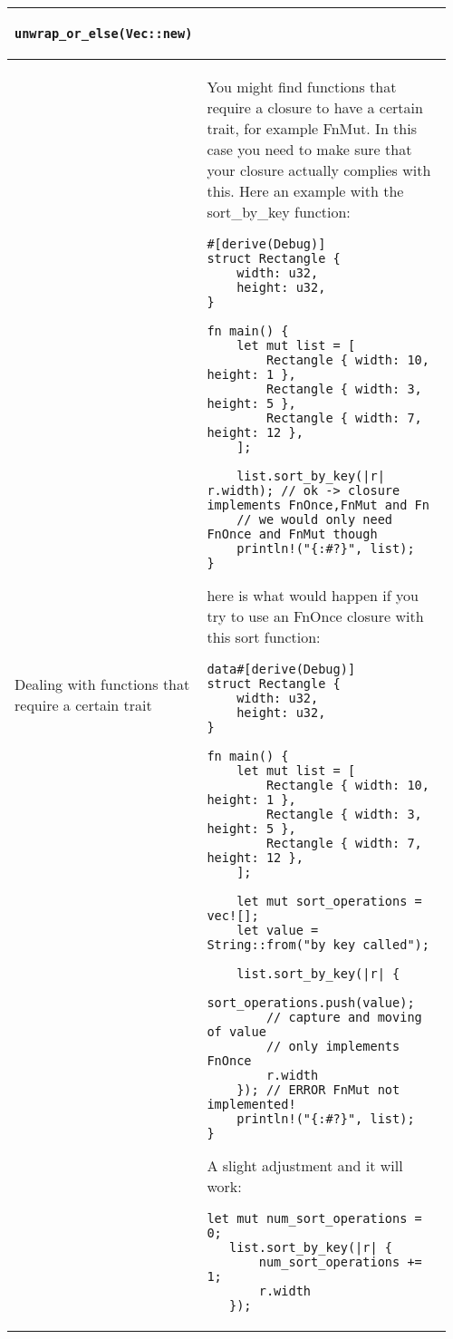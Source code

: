 \documentclass[main.tex,fontsize=8pt,paper=a4,paper=portrait,DIV=calc,]{scrartcl}
\begin{document}
\begin{table}[ht!]
\begin{tabular}{|m{0.2\linewidth}|m{0.755\linewidth}|}
\begin{lstlisting}
unwrap_or_else(Vec::new)
\end{lstlisting}\\
\hline
Dealing with functions that require a certain trait & 
You might find functions that require a closure to have a certain trait, for example FnMut.\newline
In this case you need to make sure that your closure actually complies with this.\newline
Here an example with the sort\_by\_key function:\newline
\begin{lstlisting}
#[derive(Debug)]
struct Rectangle {
    width: u32,
    height: u32,
}

fn main() {
    let mut list = [
        Rectangle { width: 10, height: 1 },
        Rectangle { width: 3, height: 5 },
        Rectangle { width: 7, height: 12 },
    ];

    list.sort_by_key(|r| r.width); // ok -> closure implements FnOnce,FnMut and Fn 
    // we would only need FnOnce and FnMut though
    println!("{:#?}", list);
}
\end{lstlisting} 
here is what would happen if you try to use an FnOnce closure with this sort function:\newline
\begin{lstlisting}
data#[derive(Debug)]
struct Rectangle {
    width: u32,
    height: u32,
}

fn main() {
    let mut list = [
        Rectangle { width: 10, height: 1 },
        Rectangle { width: 3, height: 5 },
        Rectangle { width: 7, height: 12 },
    ];

    let mut sort_operations = vec![];
    let value = String::from("by key called");

    list.sort_by_key(|r| {
        sort_operations.push(value); 
        // capture and moving of value 
        // only implements FnOnce
        r.width
    }); // ERROR FnMut not implemented!
    println!("{:#?}", list);
}
\end{lstlisting} 
A slight adjustment and it will work: \newline
\begin{lstlisting}
let mut num_sort_operations = 0;
   list.sort_by_key(|r| {
       num_sort_operations += 1;
       r.width
   });
\end{lstlisting}\\
\hline
\end{tabular}
\end{table}
\pagebreak
\end{document}
